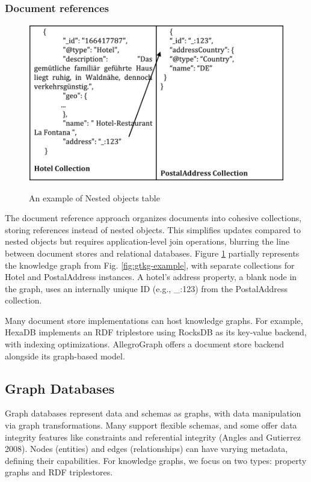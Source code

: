 \documentclass[12pt]{article}
\begin{document}
\subsubsection{Document references}
\begin{figure}
    \includegraphics[width=\linewidth]{imgs/Document references example.jpeg}
    \label{fig:document-ref-example}
    \caption{An example of Nested objects table}
\end{figure}
The document reference approach organizes documents into cohesive collections, storing references instead of nested objects. This simplifies updates compared to nested objects but requires application-level join operations, blurring the line between document stores and relational databases. Figure \ref{fig:document-ref-example} partially represents the knowledge graph from Fig. \ref{fig:gtkg-example}, with separate collections for Hotel and PostalAddress instances. A hotel's address property, a blank node in the graph, uses an internally unique ID (e.g., \_:123) from the PostalAddress collection.

Many document store implementations can host knowledge graphs. For example, HexaDB implements an RDF triplestore using RocksDB as its key-value backend, with indexing optimizations. AllegroGraph offers a document store backend alongside its graph-based model.

\subsection{Graph Databases}
Graph databases represent data and schemas as graphs, with data manipulation via graph transformations. Many support flexible schemas, and some offer data integrity features like constraints and referential integrity (Angles and Gutierrez 2008). Nodes (entities) and edges (relationships) can have varying metadata, defining their capabilities. For knowledge graphs, we focus on two types: property graphs and RDF triplestores.
\end{document}
